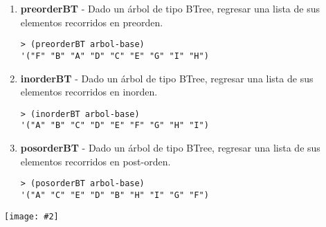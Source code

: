 \documentclass{article}
\newcommand{\jimage}[2]{\texttt{[image: \#2]}\vskip10pt}
\begin{document}
\begin{enumerate}
\item  \textbf{preorderBT} - Dado un árbol de tipo BTree, regresar una lista de sus elementos recorridos en preorden.
\begin{verbatim}
> (preorderBT arbol-base)
'("F" "B" "A" "D" "C" "E" "G" "I" "H")
\end{verbatim}

\item  \textbf{inorderBT}  - Dado un árbol de tipo BTree, regresar una lista de sus elementos recorridos en inorden.
\begin{verbatim}
> (inorderBT arbol-base)
'("A" "B" "C" "D" "E" "F" "G" "H" "I")
\end{verbatim}

\item \textbf{posorderBT} - Dado un árbol de tipo BTree, regresar una lista de sus elementos recorridos en post-orden.
\begin{verbatim}
> (posorderBT arbol-base)
'("A" "C" "E" "D" "B" "H" "I" "G" "F")
\end{verbatim}
   
\end{enumerate}

\jimage{0.8}{imgs/orders.png}
\end{document}
